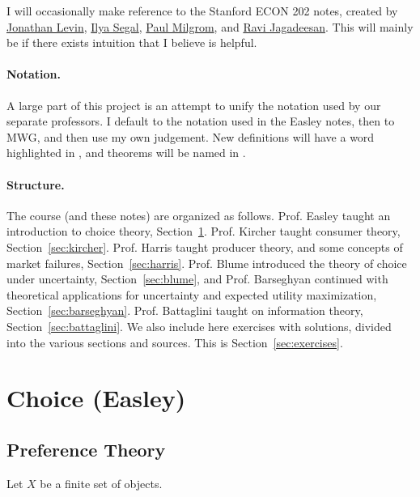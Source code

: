\documentclass[12pt]{article}
\begin{document}
I will occasionally make reference to the Stanford ECON 202 notes, created by \href{https://www.gsb.stanford.edu/faculty-research/faculty/jonathan-levin}{Jonathan Levin}, \href{https://web.stanford.edu/~isegal/}{Ilya Segal}, \href{https://milgrom.people.stanford.edu/}{Paul Milgrom}, and \href{https://sites.google.com/site/ravijagadeesan/}{Ravi Jagadeesan}. This will mainly be if there exists intuition that I believe is helpful.

\paragraph{Notation.} A large part of this project is an attempt to unify the notation used by our separate professors. I default to the notation used in the Easley notes, then to MWG, and then use my own judgement. New definitions will have a word highlighted in , and theorems will be named in . 

\paragraph{Structure.} The course (and these notes) are organized as follows. Prof. Easley taught an introduction to choice theory, Section~\ref{sec:easley}. Prof. Kircher taught consumer theory, Section~\ref{sec:kircher}. Prof. Harris taught producer theory, and some concepts of market failures, Section~\ref{sec:harris}. Prof. Blume introduced the theory of choice under uncertainty, Section~\ref{sec:blume}, and Prof. Barseghyan continued with theoretical applications for uncertainty and expected utility maximization, Section~\ref{sec:barseghyan}. Prof. Battaglini taught on information theory, Section~\ref{sec:battaglini}. We also include here exercises with solutions, divided into the various sections and sources. This is Section~\ref{sec:exercises}.


\newpage
\section{Choice (Easley)}\label{sec:easley}

\subsection{Preference Theory}

\begin{assumption}
	Let $X$ be a finite set of objects. 
\end{assumption}
\end{document}
